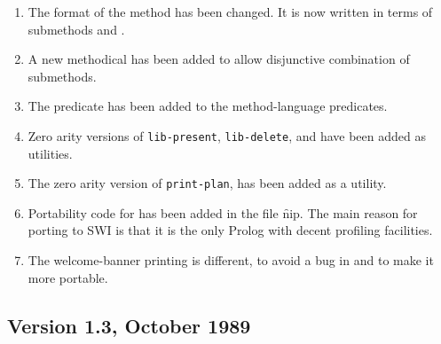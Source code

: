 \begin{enumerate}
\item
The format of the  method has been changed. It is now
written in terms of  submethods  and 
.
\item
A new  methodical has been added to allow disjunctive
combination of submethods.
\item
The predicate  has been added to the method-language predicates.
\item
Zero arity versions of {\tt lib-present}, {\tt lib-delete}, 
 and  have been added as utilities.
\item
The zero arity version of {\tt print-plan},  has been
added as a utility.
\item
Portability code for  has been added in the file
\f{nip}. The main reason for porting to SWI is that
it is the only Prolog with decent profiling facilities.
\item
The welcome-banner printing is different, to avoid a bug in
and to make it more portable.
\end{enumerate}

\subsection {Version 1.3, October 1989}

